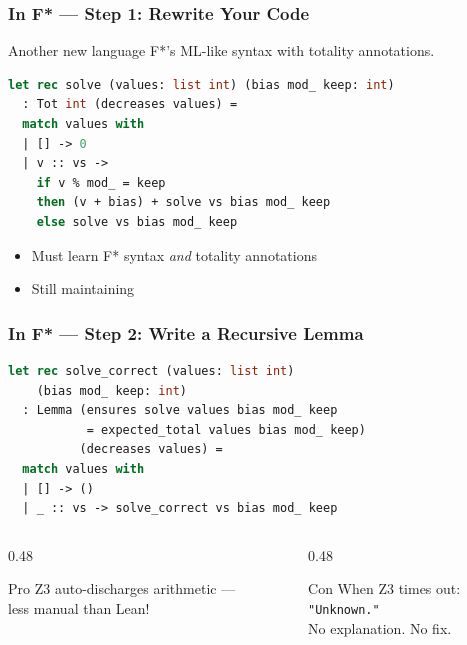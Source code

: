 \begin{frame}[fragile]
\frametitle{In F* --- Step 1: Rewrite Your Code}
\begin{alertblock}{Another new language}
F*'s ML-like syntax with totality annotations.
\end{alertblock}
\begin{lstlisting}[language=ML,morekeywords={let,rec,Tot,int,list,decreases,match,with,if,then,else}]
let rec solve (values: list int) (bias mod_ keep: int)
  : Tot int (decreases values) =
  match values with
  | [] -> 0
  | v :: vs ->
    if v % mod_ = keep
    then (v + bias) + solve vs bias mod_ keep
    else solve vs bias mod_ keep
\end{lstlisting}
\vfill
\begin{itemize}
  \item Must learn F* syntax \emph{and} totality annotations
  \item Still maintaining 
\end{itemize}
\end{frame}

\begin{frame}[fragile]
\frametitle{In F* --- Step 2: Write a Recursive Lemma}
\begin{lstlisting}[language=ML,morekeywords={let,rec,Lemma,ensures,decreases,match,with,list,int}]
let rec solve_correct (values: list int)
    (bias mod_ keep: int)
  : Lemma (ensures solve values bias mod_ keep
           = expected_total values bias mod_ keep)
          (decreases values) =
  match values with
  | [] -> ()
  | _ :: vs -> solve_correct vs bias mod_ keep
\end{lstlisting}
\vfill
\begin{columns}[T]
\begin{column}{0.48\textwidth}
\begin{exampleblock}{Pro}
Z3 auto-discharges arithmetic ---\\
less manual than Lean!
\end{exampleblock}
\end{column}
\begin{column}{0.48\textwidth}
\begin{alertblock}{Con}
When Z3 times out:\\[2pt]
\texttt{\color{jugeoRed}"Unknown."}\\[2pt]
No explanation. No fix.
\end{alertblock}
\end{column}
\end{columns}
\end{frame}

